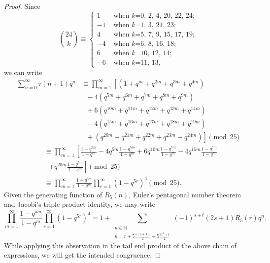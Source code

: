 \documentclass[10pt]{article}
\theoremstyle{definition}
\begin{document}
\begin{proof}
Since 
\[{24\choose{k}}\equiv\begin{cases}
1&\text{ when $k$=0, 2, 4, 20, 22, 24;}\\
-1&\text{ when $k$=1, 3, 21, 23;}\\
4&\text{ when $k$=5, 7, 9, 15, 17, 19;}\\
-4&\text{ when $k$=6, 8, 16, 18;}\\
6&\text{ when $k$=10, 12, 14;}\\
-6&\text{ when $k$=11, 13,}
\end{cases}
\]
we can write
\begin{align*}
\sum_{n=0}^{\infty}\tau(n+1)q^n
&\equiv\prod_{m=1}^{\infty}\left[\left(1+q^m+q^{2m}+q^{3m}+q^{4m}\right)\right.\\ &\text{\ \ \ \ \ \ \ \ }-4\left(q^{5m}+q^{6m}+q^{7m}+q^{8m}+q^{9m}\right)\\
&\text{\ \ \ \ \ \ \ \ }+6\left(q^{10m}+q^{11m}+q^{12m}+q^{13m}+q^{14m}\right)\\
&\text{\ \ \ \ \ \ \ \ }-4\left(q^{15m}+q^{16m}+q^{17m}+q^{18m}+q^{19m}\right)\\
&\text{\ \ \ \ \ \ \ \ }+\left.\left(q^{20m}+q^{21m}+q^{22m}+q^{23m}+q^{24m}\right)\right]\pmod{25}
\end{align*}
\begin{align*}
&\equiv\prod_{m=1}^{\infty}\left[\frac{1-q^{5m}}{1-q^m}-4q^{5m}\frac{1-q^{5m}}{1-q^m}+6q^{10m}\frac{1-q^{5m}}{1-q^m}-4q^{15m}\frac{1-q^{5m}}{1-q^m}\right.\\
&\text{\ \ \ \ \ \ \ \ }\left.+q^{20m}\frac{1-q^{5m}}{1-q^m}\right]\pmod{25}\\
&\equiv\prod_{m=1}^{\infty}\frac{1-q^{5m}}{1-q^m}\prod_{r=1}^{\infty}(1-q^{5r})^4\pmod{25}.
\end{align*}
Given the generating function of $R_5(n)$, Euler's pentagonal number theorem and Jacobi's triple product identity, we may write
\[\prod_{m=1}^{\infty}\frac{1-q^{5m}}{1-q^m}\prod_{r=1}^{\infty}(1-q^{5r})^4=1+\sum_{\substack{n\in\mathbb N\\ n=r+5\frac{s(s+1)}{2}+5\frac{3t^2\pm t}{2}}}(-1)^{s+t}(2s+1)R_{5}(r)q^n.
\]
While applying this observation in the tail end product of the above chain of expressions, we will get the intended congruence.
\end{proof}
\end{document}
